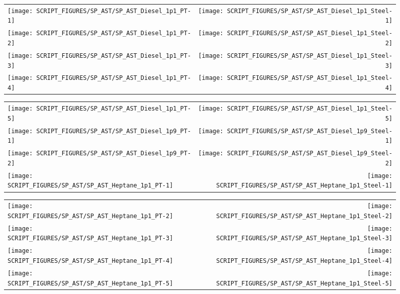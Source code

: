 \begin{figure}[p]
\begin{tabular*}{\textwidth}{l@{\extracolsep{\fill}}r}
\texttt{[image: SCRIPT\_FIGURES/SP\_AST/SP\_AST\_Diesel\_1p1\_PT-1]}  &  \texttt{[image: SCRIPT\_FIGURES/SP\_AST/SP\_AST\_Diesel\_1p1\_Steel-1]}    \\
\texttt{[image: SCRIPT\_FIGURES/SP\_AST/SP\_AST\_Diesel\_1p1\_PT-2]}  &  \texttt{[image: SCRIPT\_FIGURES/SP\_AST/SP\_AST\_Diesel\_1p1\_Steel-2]}    \\
\texttt{[image: SCRIPT\_FIGURES/SP\_AST/SP\_AST\_Diesel\_1p1\_PT-3]}  &  \texttt{[image: SCRIPT\_FIGURES/SP\_AST/SP\_AST\_Diesel\_1p1\_Steel-3]}    \\
\texttt{[image: SCRIPT\_FIGURES/SP\_AST/SP\_AST\_Diesel\_1p1\_PT-4]}  &  \texttt{[image: SCRIPT\_FIGURES/SP\_AST/SP\_AST\_Diesel\_1p1\_Steel-4]}
\end{tabular*}
\label{SP_Diesel_1p1_PT_Steel}
\end{figure}

\begin{figure}[p]
\begin{tabular*}{\textwidth}{l@{\extracolsep{\fill}}r}
\texttt{[image: SCRIPT\_FIGURES/SP\_AST/SP\_AST\_Diesel\_1p1\_PT-5]}  &  \texttt{[image: SCRIPT\_FIGURES/SP\_AST/SP\_AST\_Diesel\_1p1\_Steel-5]}   \\
\texttt{[image: SCRIPT\_FIGURES/SP\_AST/SP\_AST\_Diesel\_1p9\_PT-1]}  &  \texttt{[image: SCRIPT\_FIGURES/SP\_AST/SP\_AST\_Diesel\_1p9\_Steel-1]}   \\
\texttt{[image: SCRIPT\_FIGURES/SP\_AST/SP\_AST\_Diesel\_1p9\_PT-2]}  &  \texttt{[image: SCRIPT\_FIGURES/SP\_AST/SP\_AST\_Diesel\_1p9\_Steel-2]}   \\
\texttt{[image: SCRIPT\_FIGURES/SP\_AST/SP\_AST\_Heptane\_1p1\_PT-1]} &  \texttt{[image: SCRIPT\_FIGURES/SP\_AST/SP\_AST\_Heptane\_1p1\_Steel-1]}
\end{tabular*}
\label{SP_Diesel_1p9_PT_Steel}
\end{figure}

\begin{figure}[p]
\begin{tabular*}{\textwidth}{l@{\extracolsep{\fill}}r}
\texttt{[image: SCRIPT\_FIGURES/SP\_AST/SP\_AST\_Heptane\_1p1\_PT-2]} &  \texttt{[image: SCRIPT\_FIGURES/SP\_AST/SP\_AST\_Heptane\_1p1\_Steel-2]}  \\
\texttt{[image: SCRIPT\_FIGURES/SP\_AST/SP\_AST\_Heptane\_1p1\_PT-3]} &  \texttt{[image: SCRIPT\_FIGURES/SP\_AST/SP\_AST\_Heptane\_1p1\_Steel-3]}  \\
\texttt{[image: SCRIPT\_FIGURES/SP\_AST/SP\_AST\_Heptane\_1p1\_PT-4]} &  \texttt{[image: SCRIPT\_FIGURES/SP\_AST/SP\_AST\_Heptane\_1p1\_Steel-4]}  \\
\texttt{[image: SCRIPT\_FIGURES/SP\_AST/SP\_AST\_Heptane\_1p1\_PT-5]} &  \texttt{[image: SCRIPT\_FIGURES/SP\_AST/SP\_AST\_Heptane\_1p1\_Steel-5]}
\end{tabular*}
\label{SP_Heptane_1p1_PT_Steel}
\end{figure}


